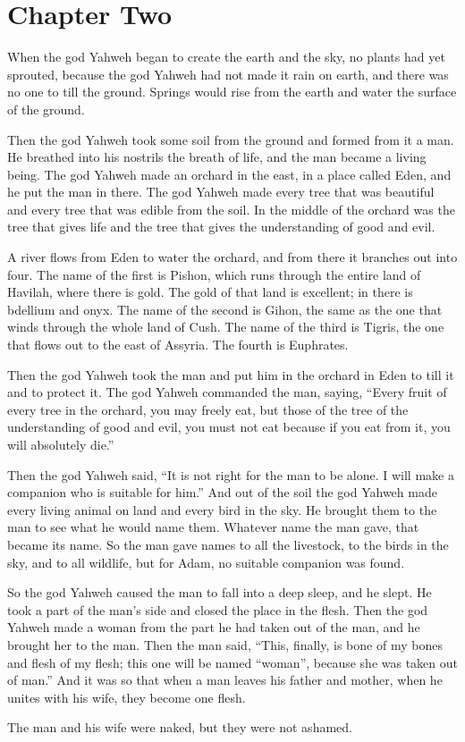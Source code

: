 \chapter*{Chapter Two}

When the god Yahweh began to create the earth and the sky, no plants had yet 
sprouted, because the god Yahweh had not made it rain on earth, 
and there was no one to till the ground.  Springs would rise from the earth 
and water the surface of the ground.

Then the god Yahweh took some soil from the ground and formed from it a man.  
He breathed into his nostrils the breath of life, and the man became 
a living being.  The god Yahweh made an orchard in the east, in a place called 
Eden, and he put the man in there.  The god Yahweh made every tree that was beautiful 
and every tree that was edible from the soil.  In the middle of the orchard was the tree that
gives life and the tree that gives the understanding of good and evil.

A river flows from Eden to water the orchard, and from there it branches out 
into four.  The name of the first is Pishon, which runs through the entire land 
of Havilah, where there is gold.  The gold of that land is excellent; in there is 
bdellium and onyx.  The name of the second is Gihon, the same as the one that 
winds through the whole land of Cush.  The name of the third is Tigris, the one 
that flows out to the east of Assyria.  The fourth is Euphrates.

Then the god Yahweh took the man and put him in the orchard in Eden to till it 
and to protect it.  The god Yahweh commanded the man, saying, 
\enquote{Every fruit of every tree in the orchard, you may freely eat, but 
those of the tree of the understanding of good and evil, you must not eat 
because if you eat from it, you will absolutely die.}

Then the god Yahweh said, \enquote{It is not right for the man to be alone.  
I will make a companion who is suitable for him.} And out of the soil the god 
Yahweh made every living animal on land and every bird in the sky.  He brought 
them to the man to see what he would name them.  Whatever name the man gave, 
that became its name.  So the man gave names to all the livestock, to the birds 
in the sky, and to all wildlife, but for Adam, no suitable companion was found.

So the god Yahweh caused the man to fall into a deep sleep, and he slept.  He 
took a part of the man’s side and closed the place in the flesh.  Then the god 
Yahweh made a woman from the part he had taken out of the man, and he brought 
her to the man.  Then the man said, \enquote{This, finally, is bone of my bones 
and flesh of my flesh; this one will be named “woman”, because she was taken out 
of man.} And it was so that when a man leaves his father and mother, when he 
unites with his wife, they become one flesh.  

The man and his wife were naked, but they were not ashamed.
